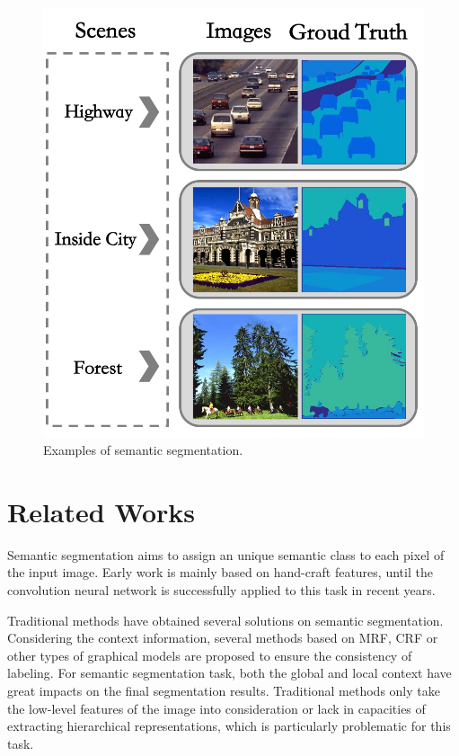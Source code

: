 \documentclass[10.5pt,compsoc]{TsT}
\newcommand{\upcite}[1]{\superscript{\textsuperscript{\cite{#1}}}}
\theoremstyle{mystyle}
\newcommand{\upcite}[1]{\textsuperscript{\cite{#1}}}
\begin{document}
{\begin{figure}
\centering
\includegraphics[width=0.95\columnwidth]{fig1.png}
\caption{Examples of semantic segmentation.}
\label{fig:example}
\end{figure} 


\section{Related Works}
\label{s:Related}
\noindent
Semantic segmentation aims to assign an unique semantic class to each pixel of the input image. Early work is mainly based on hand-craft features, until the convolution neural network is successfully applied to this task in recent years.

Traditional methods have obtained several solutions on semantic segmentation. Considering the context information, several methods based on MRF, CRF or other types of graphical models are proposed to ensure the consistency of labeling\upcite{8,10,33}. For semantic segmentation task, both the global and local context have great impacts on the final segmentation results. Traditional methods only take the low-level features of the image into consideration or lack in capacities of extracting hierarchical representations, which is particularly problematic for this task.

}
\end{document}

